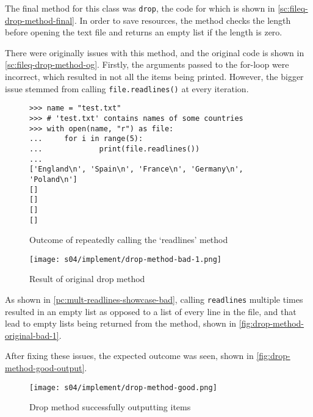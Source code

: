 
        The final method for this class was \verb|drop|, the code for which is shown in \autoref{sc:fileq-drop-method-final}. 
        In order to save resources, the method checks the length before opening the text file and returns an empty list if the length is zero. 

        There were originally issues with this method, and the original code is shown in \autoref{sc:fileq-drop-method-og}. 
        Firstly, the arguments passed to the for-loop were incorrect, which resulted in not all the items being printed. 
        However, the bigger issue stemmed from calling \verb|file.readlines()| at every iteration. 

        \begin{figure}[!ht]
            \begin{verbatim}
>>> name = "test.txt"
>>> # 'test.txt' contains names of some countries
>>> with open(name, "r") as file:
...     for i in range(5):
...             print(file.readlines())
... 
['England\n', 'Spain\n', 'France\n', 'Germany\n', 'Poland\n']
[]
[]
[]
[] 
            \end{verbatim}
            \caption{Outcome of repeatedly calling the `readlines' method}
            \label{pc:mult-readlines-showcase-bad}
        \end{figure}

        \begin{figure}[!ht]
            \centering
            \texttt{[image: s04/implement/drop-method-bad-1.png]}
            \caption{Result of original drop method}
            \label{fig:drop-method-original-bad-1}
        \end{figure}

        As shown in \autoref{pc:mult-readlines-showcase-bad}, calling \verb|readlines| multiple times resulted in an empty list as opposed to a list of every line in the file, and that lead to empty lists being returned from the method, shown in \autoref{fig:drop-method-original-bad-1}.


        After fixing these issues, the expected outcome was seen, shown in \autoref{fig:drop-method-good-output}.

        \begin{figure}[!ht]
            \centering
            \texttt{[image: s04/implement/drop-method-good.png]}
            \caption{Drop method successfully outputting items}
            \label{fig:drop-method-good-output}
        \end{figure}


